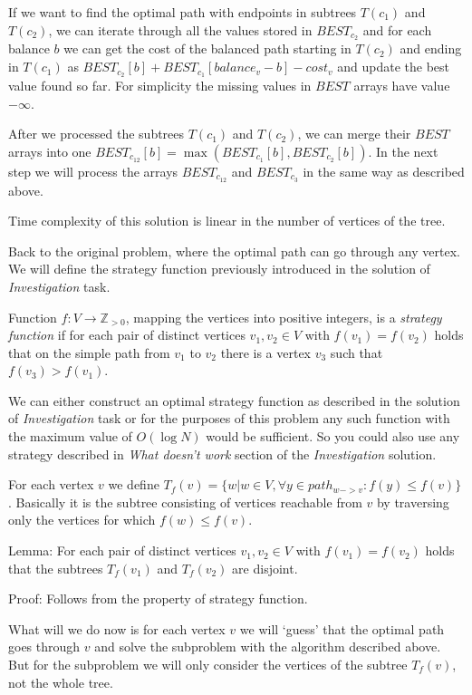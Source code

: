 If we want to find the optimal path with endpoints in subtrees $T(c_1)$ and $T(c_2)$, we can
iterate through all the values stored in $BEST_{c_2}$ and for each balance $b$
we can get the cost of the balanced path starting in $T(c_2)$ and ending in $T(c_1)$
as $BEST_{c_2}[b] + BEST_{c_1}[balance_v-b] - cost_v$ and update the best value found so far.
For simplicity the missing values in $BEST$ arrays have value $-\infty$.

After we processed the subtrees $T(c_1)$ and $T(c_2)$, we can merge their $BEST$ arrays
into one $BEST_{c_12}[b] = \max(BEST_{c_1}[b], BEST_{c_2}[b])$.
In the next step we will process the arrays $BEST_{c_12}$ and $BEST_{c_3}$ in the same way as described above.

Time complexity of this solution is linear in the number of vertices of the tree.



Back to the original problem, where the optimal path can go through any vertex.
We will define the strategy function previously introduced in the solution of \emph{Investigation} task.

Function $f : V \to \mathbb Z_{> 0}$, mapping the vertices into positive integers, is a \emph{strategy function} if
for each pair of distinct vertices $v_1, v_2 \in V$ with $f(v_1) = f(v_2)$ holds that
on the simple path from $v_1$ to $v_2$ there is a vertex $v_3$ such that $f(v_3) > f(v_1)$.

We can either construct an optimal strategy function as described in the solution of \emph{Investigation} task
or for the purposes of this problem any such function with the maximum value of $O(\log N)$ would be sufficient.
So you could also use any strategy described in \emph{What doesn't work} section of the \emph{Investigation} solution.

For each vertex $v$ we define $T_f(v) = \{w | w \in V, \forall y \in path_{w->v}: f(y) \leq f(v) \}$.
Basically it is the subtree consisting of vertices reachable from $v$ by traversing only the vertices for which $f(w) \leq f(v)$.

Lemma: For each pair of distinct vertices $v_1, v_2 \in V$ with $f(v_1) = f(v_2)$ holds that
the subtrees $T_f(v_1)$ and $T_f(v_2)$ are disjoint.

Proof: Follows from the property of strategy function.

What will we do now is for each vertex $v$ we will `guess' that the optimal path
goes through $v$ and solve the subproblem with the algorithm described above.
But for the subproblem we will only consider the vertices of
the subtree $T_f(v)$, not the whole tree.

